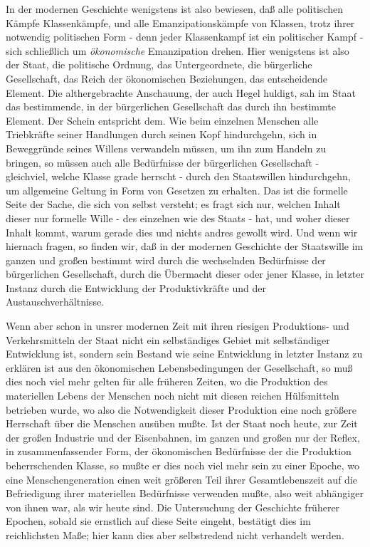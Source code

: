 In der modernen Geschichte wenigstens ist also bewiesen, daß
alle politischen Kämpfe Klassenkämpfe, und alle Emanzipationskämpfe von
Klassen, trotz ihrer notwendig politischen Form - denn jeder
Klassenkampf ist ein politischer Kampf - sich schließlich
um \emph{ökonomische} Emanzipation drehen. Hier wenigstens ist also der
Staat, die politische Ordnung, das Untergeordnete, die bürgerliche
Gesellschaft, das Reich der ökonomischen Beziehungen, das entscheidende
Element. Die althergebrachte Anschauung, der auch Hegel huldigt, sah im
Staat das bestimmende, in der bürgerlichen Gesellschaft das durch ihn
bestimmte Element. Der Schein entspricht dem. Wie beim einzelnen
Menschen alle Triebkräfte seiner Handlungen durch seinen Kopf
hindurchgehn, sich in Beweggründe seines Willens verwandeln müssen, um
ihn zum Handeln zu bringen, so müssen auch alle Bedürfnisse der
bürgerlichen Gesellschaft - gleichviel, welche Klasse grade herrscht -
durch den Staatswillen hindurchgehn, um allgemeine Geltung in Form von
Gesetzen zu erhalten. Das ist die formelle Seite der Sache, die sich von
selbst versteht; es fragt sich nur, welchen Inhalt dieser nur formelle
Wille - des einzelnen wie des Staats - hat, und woher dieser Inhalt
kommt, warum gerade dies und nichts andres gewollt wird. Und wenn wir
hiernach fragen, so finden wir, daß in der modernen Geschichte der
Staatswille im ganzen und großen bestimmt wird durch die wechselnden
Bedürfnisse der bürgerlichen Gesellschaft, durch die Übermacht dieser
oder jener Klasse, in letzter Instanz durch die Entwicklung der
Produktivkräfte und der Austauschverhältnisse.

Wenn aber schon in unsrer modernen Zeit mit ihren riesigen
Produktions- und Verkehrsmitteln der Staat nicht ein selbständiges
Gebiet mit selbständiger Entwicklung ist, sondern sein Bestand wie seine
Entwicklung in letzter Instanz zu erklären ist aus den ökonomischen
Lebensbedingungen der Gesellschaft, so muß dies noch viel mehr gelten
für alle früheren Zeiten, wo die Produktion des materiellen Lebens der
Menschen noch nicht mit diesen reichen Hülfsmitteln betrieben wurde, wo
also die Notwendigkeit dieser Produktion eine noch größere Herrschaft
über die Menschen ausüben mußte. Ist der Staat noch heute, zur Zeit der
großen Industrie und der Eisenbahnen, im ganzen und großen nur der
Reflex, in zusammenfassender Form, der ökonomischen Bedürfnisse der die
Produktion beherrschenden Klasse, so mußte er dies noch viel mehr sein
zu einer Epoche, wo eine Menschengeneration einen weit größeren Teil
ihrer Gesamtlebenszeit auf die Befriedigung ihrer materiellen
Bedürfnisse verwenden mußte, also weit abhängiger von ihnen war, als wir
heute sind. Die Untersuchung der Geschichte früherer Epochen, sobald sie
ernstlich auf diese Seite eingeht, bestätigt dies im reichlichsten Maße;
hier kann dies aber selbstredend nicht verhandelt werden.

